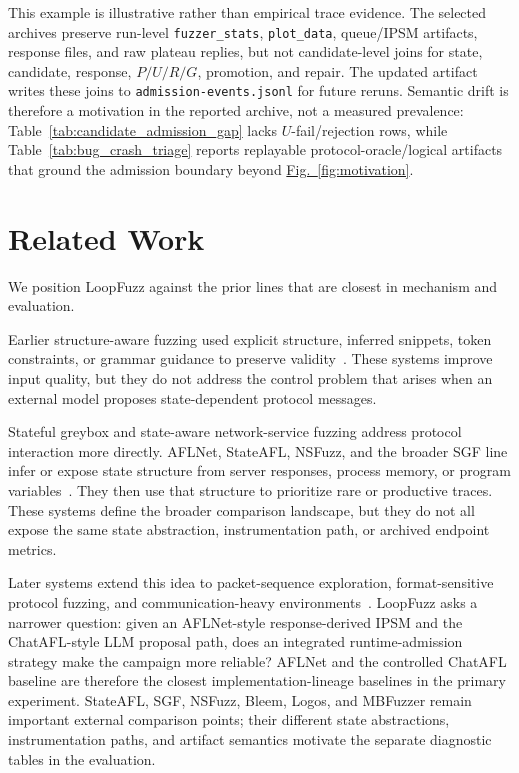 \documentclass[final,5p,times,number]{elsarticle}
\newcommand{\figref}[1]{\hyperref[#1]{Fig.~\ref*{#1}}}
\begin{document}
This example is illustrative rather than empirical trace evidence. The selected archives preserve run-level \texttt{fuzzer\_stats}, \texttt{plot\_data}, queue/IPSM artifacts, response files, and raw plateau replies, but not candidate-level joins for state, candidate, response, $P/U/R/G$, promotion, and repair. The updated artifact writes these joins to \texttt{admission-events.jsonl} for future reruns. Semantic drift is therefore a motivation in the reported archive, not a measured prevalence: Table~\ref{tab:candidate_admission_gap} lacks $U$-fail/rejection rows, while Table~\ref{tab:bug_crash_triage} reports replayable protocol-oracle/logical artifacts that ground the admission boundary beyond \figref{fig:motivation}.

\section{Related Work}
We position LoopFuzz against the prior lines that are closest in mechanism and evaluation.

Earlier structure-aware fuzzing used explicit structure, inferred snippets, token constraints, or grammar guidance to preserve validity~\cite{snipuzz_black_box_fuzzing_2021,token_level_fuzzing_2021,gramatron_effective_grammar_aware_2021,griffin_grammar_free_dbms_2022,no_grammar_no_problem_2023,likely_invariants_feedback_2021,mundofuzz_grammar_inference_2022}. These systems improve input quality, but they do not address the control problem that arises when an external model proposes state-dependent protocol messages.

Stateful greybox and state-aware network-service fuzzing address protocol interaction more directly. AFLNet, StateAFL, NSFuzz, and the broader SGF line infer or expose state structure from server responses, process memory, or program variables~\cite{aflnet,stateafl,nsfuzz,sgf_usenix22,profuzzbench_benchmark_stateful_protocol_2021}. They then use that structure to prioritize rare or productive traces. These systems define the broader comparison landscape, but they do not all expose the same state abstraction, instrumentation path, or archived endpoint metrics.

Later systems extend this idea to packet-sequence exploration, format-sensitive protocol fuzzing, and communication-heavy environments~\cite{bleem_packet_sequence_2023,formatted_stateful_greybox_fuzzing_2024,logos_log_guided_fuzzing_2024,msgfuzzer_message_sequence_guided_2024,resolverfuzz_query_response_2024,mbfuzzer_mqtt_2025,fuzzusb_hybrid_stateful_fuzzing_2022,dtls_fuzzer_dtls_protocol_2022,edhoc_fuzzer_edhoc_protocol_2023,tron_fuzzing_linux_network_2025}. LoopFuzz asks a narrower question: given an AFLNet-style response-derived IPSM and the ChatAFL-style LLM proposal path, does an integrated runtime-admission strategy make the campaign more reliable? AFLNet and the controlled ChatAFL baseline are therefore the closest implementation-lineage baselines in the primary experiment. StateAFL, SGF, NSFuzz, Bleem, Logos, and MBFuzzer remain important external comparison points; their different state abstractions, instrumentation paths, and artifact semantics motivate the separate diagnostic tables in the evaluation.
\end{document}
